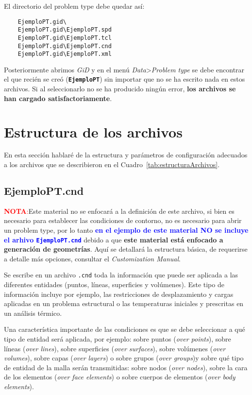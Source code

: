 \documentclass[10pt, a4paper, twocolumn]{article}
\begin{document}
El directorio del problem type debe quedar así:

\begin{verbatim}
	EjemploPT.gid\
	EjemploPT.gid\EjemploPT.spd
	EjemploPT.gid\EjemploPT.tcl
	EjemploPT.gid\EjemploPT.cnd
	EjemploPT.gid\EjemploPT.xml
\end{verbatim}

Posteriormente abrimos \textit{GiD} y en el menú \textit{Data}>\textit{Problem type} se debe encontrar el que recién se creó (\textbf{\texttt{EjemploPT}}) sin importar que no se ha escrito nada en estos archivos. Si al seleccionarlo no se ha producido ningún error, \textbf{los archivos se han cargado satisfactoriamente}.

\section{Estructura de los archivos}

En esta sección hablaré de la estructura y parámetros de configuración adecuados a los archivos que se describieron en el Cuadro~\ref{tab:estructuraArchivos}.

\subsection{EjemploPT.cnd}

\textcolor{red}{\textbf{NOTA}:}Este material no se enfocará a la definición de este archivo, si bien es necesario para establecer las condiciones de contorno, no es necesario para abrir un problem type, por lo tanto \textcolor{blue}{\textbf{en el ejemplo de este material NO se incluye el arhivo \texttt{EjemploPT.cnd}}} debido a que \textbf{este material está enfocado a generación de geometrías}. Aquí se detallará la estructura básica, de requerirse a detalle más opciones, consultar el \textit{Customization Manual}.

Se escribe en un archivo \texttt{.cnd} toda la información que puede ser aplicada a las diferentes entidades (puntos, líneas, superficies y volúmenes). Este tipo de información incluye por ejemplo, las restricciones de desplazamiento y cargas aplicadas en un problema estructural o las temperaturas iniciales y prescritas en un análisis térmico.

Una característica importante de las condiciones es que se debe seleccionar a qué tipo de entidad será aplicada, por ejemplo: sobre puntos (\textit{over points}), sobre líneas (\textit{over lines}), sobre superficies (\textit{over surfaces}), sobre volúmenes (\textit{over volumes}), sobre capas (\textit{over layers}) o sobre grupos (\textit{over groups})y sobre qué tipo de entidad de la malla serán transmitidas: sobre nodos (\textit{over nodes}), sobre la cara de los elementos (\textit{over face elements}) o sobre cuerpos de elementos (\textit{over body elements}).
\end{document}
